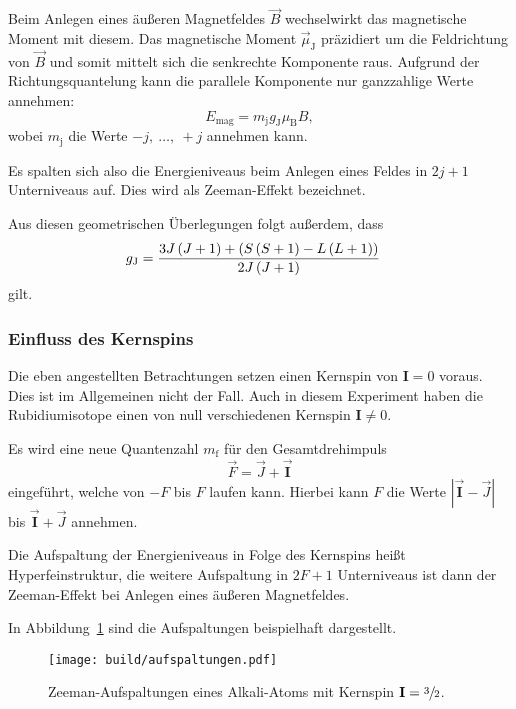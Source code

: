 Beim Anlegen eines äußeren Magnetfeldes $\vec{B}$ wechselwirkt das magnetische Moment mit diesem.
Das magnetische Moment $\vec{\mu}_{\text{J}}$ präzidiert um die Feldrichtung von
$\vec{B}$ und somit mittelt sich die senkrechte Komponente raus.
Aufgrund der Richtungsquantelung kann die parallele Komponente nur ganzzahlige Werte annehmen:
\begin{equation}
  E_\text{mag} = m_\text{j} g_{\text{J}} \mu_\text{B} B,
\end{equation}
wobei $m_\text{j}$ die Werte $-j,~\ldots,~+j$ annehmen kann.

Es spalten sich also die Energieniveaus beim Anlegen eines Feldes in $2j + 1$ Unterniveaus auf.
Dies wird als Zeeman-Effekt bezeichnet.

Aus diesen geometrischen Überlegungen folgt außerdem, dass
\begin{align}
  \label{eq:g_j}
  g_\text{J} &= \frac{%
    3 J \left(J + 1\right) + \left(S\left(S + 1\right) - L \left(L + 1\right)\right)
  }{2 J \left(J + 1\right)}
\end{align}
gilt.


\subsubsection{Einfluss des Kernspins}%
\label{sub:einfluss_des_kernspins}

Die eben angestellten Betrachtungen setzen einen Kernspin von $\mathbf{I} = 0$
voraus.
Dies ist im Allgemeinen nicht der Fall.
Auch in diesem Experiment haben die Rubidiumisotope einen von null verschiedenen Kernspin
$\mathbf{I} \neq 0$.

Es wird eine neue Quantenzahl $m_\text{f}$ für den Gesamtdrehimpuls
\begin{equation}
  \vec{F} = \vec{J} + \vec{\mathbf{I}}
\end{equation}
eingeführt, welche von $-F$ bis $F$ laufen kann.
Hierbei kann $F$ die Werte
$\left|\vec{\mathbf{I}} - \vec{J}\right|$ bis $\vec{\mathbf{I}} + \vec{J}$
annehmen.

Die Aufspaltung der Energieniveaus in Folge des Kernspins heißt
Hyperfeinstruktur, die weitere Aufspaltung in $2F + 1$ Unterniveaus ist dann
der Zeeman-Effekt bei Anlegen eines äußeren Magnetfeldes.

In Abbildung~\ref{fig:aufspaltungen} sind die Aufspaltungen beispielhaft
dargestellt.

\begin{figure}[ht]
  \centering
  \texttt{[image: build/aufspaltungen.pdf]}
  \caption{%
    Zeeman-Aufspaltungen eines Alkali-Atoms mit Kernspin $\mathbf{I}
    = \sfrac{3}{2}$.\cite{anleitung}%
  }%
  \label{fig:aufspaltungen}
\end{figure}

